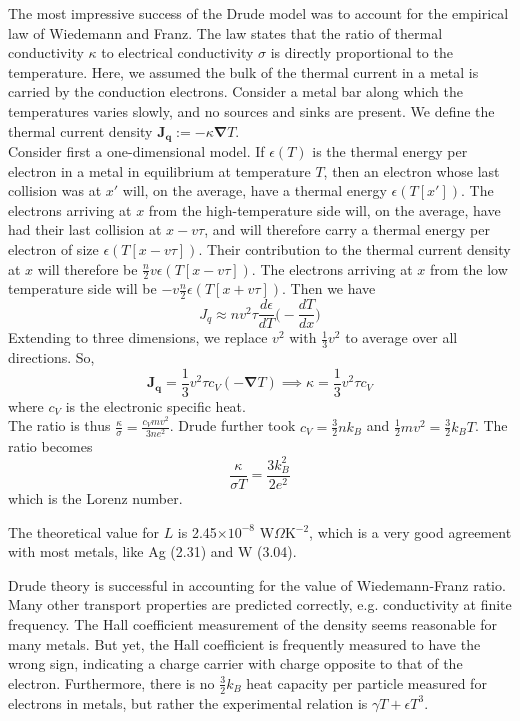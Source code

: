 \documentclass[a4paper]{article}
\begin{document}
\newpage
\begin{Note}
The most impressive success of the Drude model was to account for the empirical law of Wiedemann and Franz. The law states that the ratio of thermal conductivity $\kappa$ to electrical conductivity $\sigma$ is directly proportional to the temperature. Here, we assumed the bulk of the thermal current in a metal is carried by the conduction electrons. Consider a metal bar along which the temperatures varies slowly, and no sources and sinks are present. We define the thermal current density $\mathbf{J_q}:=-\kappa\boldsymbol{\nabla}T$.\\[5pt]
Consider first a one-dimensional model. If $\epsilon(T)$ is the thermal energy per electron in a metal in equilibrium at temperature $T$, then an electron whose last collision was at $x'$ will, on the average, have a thermal energy $\epsilon(T[x'])$. The electrons arriving at $x$ from the high-temperature side will, on the average, have had their last collision at $x-v\tau$, and will therefore carry a thermal energy per electron of size $\epsilon(T[x-v\tau])$. Their contribution to the thermal current density at $x$ will therefore be $\frac{n}{2}v\epsilon(T[x-v\tau])$. The electrons arriving at $x$ from the low temperature side will be $-v\frac{n}{2}\epsilon(T[x+v\tau])$. Then we have 
$$J_q\approx nv^2\tau\frac{d\epsilon}{dT}\bigg(-\frac{dT}{dx}\bigg)$$
Extending to three dimensions, we replace $v^2$ with $\frac{1}{3}v^2$ to average over all directions. So,
$$\mathbf{J_q}=\frac{1}{3}v^2\tau c_V(-\boldsymbol{\nabla}T)\implies\kappa=\frac{1}{3}v^2\tau c_V$$
where $c_V$ is the electronic specific heat.\\[5pt]
The ratio is thus $\frac{\kappa}{\sigma}=\frac{c_Vmv^2}{3ne^2}$. Drude further took $c_V=\frac{3}{2}nk_B$ and $\frac{1}{2}mv^2=\frac{3}{2}k_BT$. The ratio becomes
$$\frac{\kappa}{\sigma T}=\frac{3k_B^2}{2e^2}$$
which is the Lorenz number.
\end{Note}
\begin{eg}
The theoretical value for $L$ is 2.45$\times10^{-8}$ W$\Omega$K$^{-2}$, which is a very good agreement with most metals, like Ag (2.31) and W (3.04).
\end{eg}
\begin{Note}
Drude theory is successful in accounting for the value of Wiedemann-Franz ratio. Many other transport properties are predicted correctly, e.g. conductivity at finite frequency. The Hall coefficient measurement of the density seems reasonable for many metals. But yet, the Hall coefficient is frequently measured to have the wrong sign, indicating a charge carrier with charge opposite to that of the electron. Furthermore, there is no $\frac{3}{2}k_B$ heat capacity per particle measured for electrons in metals, but rather the experimental relation is $\gamma T+\epsilon T^3$.
\end{Note}
\newpage
\end{document}
